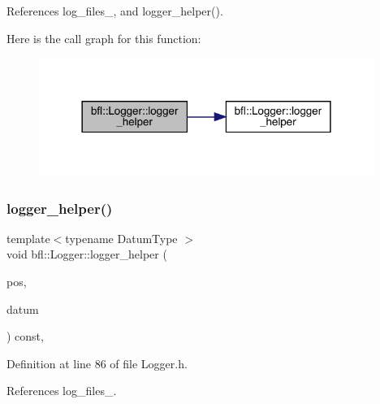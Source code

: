 References log\+\_\+files\+\_\+, and logger\+\_\+helper().

Here is the call graph for this function\+:
\nopagebreak
\begin{figure}[H]
\begin{center}
\leavevmode
\includegraphics[width=309pt]{classbfl_1_1Logger_ac45b73649e685802837bf97c10146c3a_cgraph}
\end{center}
\end{figure}
\mbox{\label{classbfl_1_1Logger_a73ff9a8b5a316a2338967fdfb7440aea}} 
\subsubsection{\texorpdfstring{logger\+\_\+helper()}{logger\_helper()}\hspace{0.1cm}{\footnotesize\ttfamily [3/4]}}
{\footnotesize\ttfamily template$<$typename Datum\+Type $>$ \\
void bfl\+::\+Logger\+::logger\+\_\+helper (\begin{DoxyParamCaption}\item[{const size\+\_\+t}]{pos,  }\item[{Datum\+Type}]{datum }\end{DoxyParamCaption}) const\hspace{0.3cm}{\ttfamily [inline]}, {\ttfamily [private]}}



Definition at line 86 of file Logger.\+h.



References log\+\_\+files\+\_\+.

\mbox{\label{classbfl_1_1Logger_a9ac71d17bc482feeda35c6d91396cac2}} 
